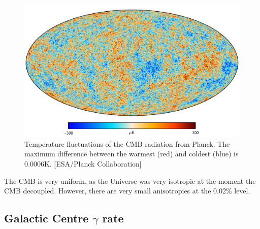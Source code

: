 \begin{figure}[!htbp]%
    \centering
    \includegraphics[width=\textwidth]{Figures/DarkMatterEvidence/cmb_radiation.png}
    \caption{Temperature fluctuations of the CMB radiation from Planck.
             The maximum difference between the warmest (red) and coldest (blue) is 0.0006K.
             [ESA/Planck Collaboration]}
    \label{fig:DM_Evidence_CMB_Map}
\end{figure}

The CMB is very uniform, as the Universe was very isotropic at the moment the CMB decoupled. 
However, there are very small anisotropies at the 0.02\% level.


\subsection{Galactic Centre $\gamma$ rate}
\par


